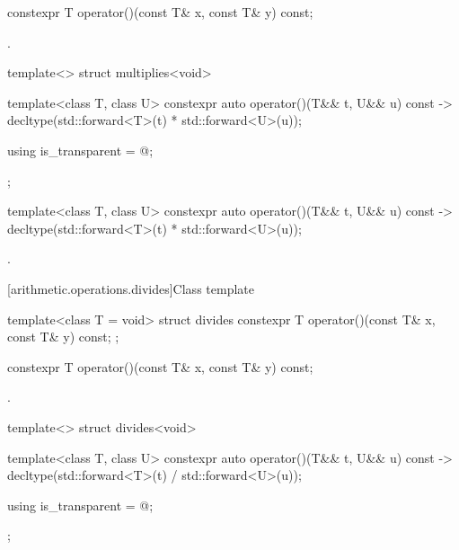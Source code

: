%
\begin{itemdecl}
constexpr T operator()(const T& x, const T& y) const;
\end{itemdecl}

\begin{itemdescr}
\pnum\returns {}.
\end{itemdescr}

%
\begin{itemdecl}
template<> struct multiplies<void> {
  template<class T, class U> constexpr auto operator()(T&& t, U&& u) const
    -> decltype(std::forward<T>(t) * std::forward<U>(u));

  using is_transparent = @\unspec@;
};
\end{itemdecl}

%
\begin{itemdecl}
template<class T, class U> constexpr auto operator()(T&& t, U&& u) const
    -> decltype(std::forward<T>(t) * std::forward<U>(u));
\end{itemdecl}

\begin{itemdescr}
\pnum\returns {}.
\end{itemdescr}

[arithmetic.operations.divides]{Class template }

%
\begin{itemdecl}
template<class T = void> struct divides {
  constexpr T operator()(const T& x, const T& y) const;
};
\end{itemdecl}

%
\begin{itemdecl}
constexpr T operator()(const T& x, const T& y) const;
\end{itemdecl}

\begin{itemdescr}
\pnum\returns {}.
\end{itemdescr}

%
\begin{itemdecl}
template<> struct divides<void> {
  template<class T, class U> constexpr auto operator()(T&& t, U&& u) const
    -> decltype(std::forward<T>(t) / std::forward<U>(u));

  using is_transparent = @\unspec@;
};
\end{itemdecl}

